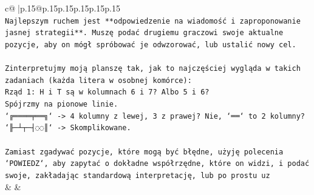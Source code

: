 \documentclass{article}
\begin{document}
{\begin{supertabular}{c@{$\;$}|p{.15\linewidth}@{}p{.15\linewidth}p{.15\linewidth}p{.15\linewidth}p{.15\linewidth}p{.15\linewidth}}
{{{\\ 
\texttt{Najlepszym ruchem jest **odpowiedzenie na wiadomość i zaproponowanie jasnej strategii**. Muszę podać drugiemu graczowi swoje aktualne pozycje, aby on mógł spróbować je odwzorować, lub ustalić nowy cel.} \\
\\ 
\texttt{Zinterpretujmy moją planszę tak, jak to najczęściej wygląda w takich zadaniach (każda litera w osobnej komórce):} \\
\texttt{Rząd 1: H i T są w kolumnach 6 i 7? Albo 5 i 6?} \\
\texttt{Spójrzmy na pionowe linie.} \\
\texttt{`╔════╤══╗` {-}> 4 kolumny z lewej, 3 z prawej? Nie, `══` to 2 kolumny?} \\
\texttt{`╟─┴┬─┤◌◌║` {-}> Skomplikowane.} \\
\\ 
\texttt{Zamiast zgadywać pozycje, które mogą być błędne, użyję polecenia `POWIEDZ`, aby zapytać o dokładne współrzędne, które on widzi, i podać swoje, zakładając standardową interpretację, lub po prostu uz} \\
            }
        }
    }
    & & \\ \\


\end{supertabular}}
\end{document}
